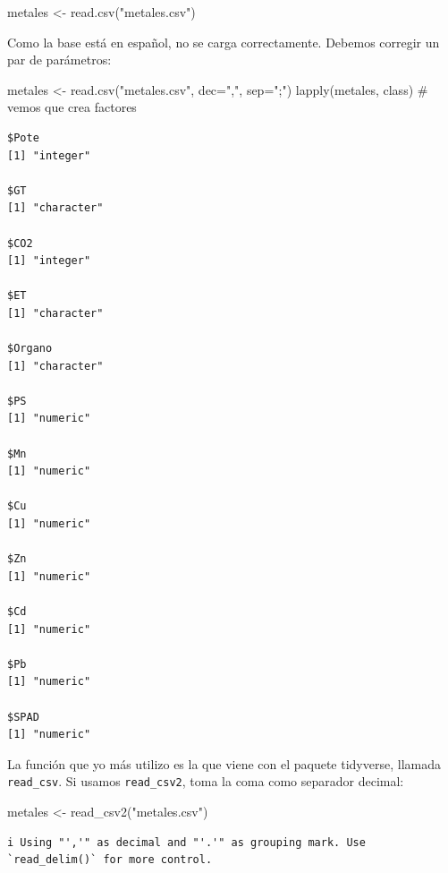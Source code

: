 \documentclass[
  letterpaper,
  DIV=11,
  numbers=noendperiod]{scrartcl}
\newenvironment{Shaded}{\begin{snugshade}}{\end{snugshade}}
\newcommand{\AttributeTok}[1]{\textcolor[rgb]{0.40,0.45,0.13}{#1}}
\newcommand{\CommentTok}[1]{\textcolor[rgb]{0.37,0.37,0.37}{#1}}
\newcommand{\FunctionTok}[1]{\textcolor[rgb]{0.28,0.35,0.67}{#1}}
\newcommand{\NormalTok}[1]{\textcolor[rgb]{0.00,0.23,0.31}{#1}}
\newcommand{\OtherTok}[1]{\textcolor[rgb]{0.00,0.23,0.31}{#1}}
\newcommand{\StringTok}[1]{\textcolor[rgb]{0.13,0.47,0.30}{#1}}
\begin{document}
\begin{Shaded}
\begin{Highlighting}[]
\NormalTok{metales }\OtherTok{\textless{}{-}} \FunctionTok{read.csv}\NormalTok{(}\StringTok{"metales.csv"}\NormalTok{)}
\end{Highlighting}
\end{Shaded}

Como la base está en español, no se carga correctamente. Debemos
corregir un par de parámetros:

\begin{Shaded}
\begin{Highlighting}[]
\NormalTok{metales }\OtherTok{\textless{}{-}} \FunctionTok{read.csv}\NormalTok{(}\StringTok{"metales.csv"}\NormalTok{, }\AttributeTok{dec=}\StringTok{","}\NormalTok{, }\AttributeTok{sep=}\StringTok{";"}\NormalTok{)}
\FunctionTok{lapply}\NormalTok{(metales, class) }\CommentTok{\# vemos que crea factores}
\end{Highlighting}
\end{Shaded}

\begin{verbatim}
$Pote
[1] "integer"

$GT
[1] "character"

$CO2
[1] "integer"

$ET
[1] "character"

$Organo
[1] "character"

$PS
[1] "numeric"

$Mn
[1] "numeric"

$Cu
[1] "numeric"

$Zn
[1] "numeric"

$Cd
[1] "numeric"

$Pb
[1] "numeric"

$SPAD
[1] "numeric"
\end{verbatim}

La función que yo más utilizo es la que viene con el paquete tidyverse,
llamada \texttt{read\_csv}. Si usamos \texttt{read\_csv2}, toma la coma
como separador decimal:

\begin{Shaded}
\begin{Highlighting}[]
\NormalTok{metales }\OtherTok{\textless{}{-}} \FunctionTok{read\_csv2}\NormalTok{(}\StringTok{"metales.csv"}\NormalTok{)}
\end{Highlighting}
\end{Shaded}

\begin{verbatim}
i Using "','" as decimal and "'.'" as grouping mark. Use `read_delim()` for more control.
\end{verbatim}
\end{document}

